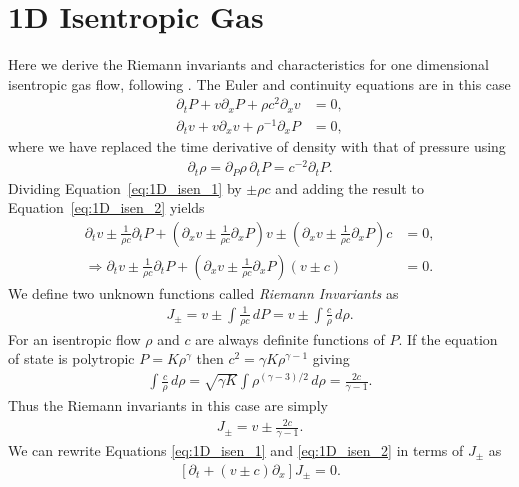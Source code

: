 \chapter{1D Isentropic Gas} \label{appendix:isentropic_riemann}

Here we derive the Riemann invariants and characteristics for one dimensional isentropic gas flow, following \citet{landau1987}.
The Euler and continuity equations are in this case
\begin{align}
    \partial_t P + v \partial_x P + \rho c^2 \partial_x v &= 0, \label{eq:1D_isen_1} \\
    \partial_t v + v \partial_x v + \rho^{-1} \partial_x P &=0, \label{eq:1D_isen_2}
\end{align}
where we have replaced the time derivative of density with that of pressure using
\begin{align}
    \partial_t \rho = \partial_P \rho \, \partial_t P = c^{-2} \partial_t P.
\end{align}
Dividing Equation~\eqref{eq:1D_isen_1} by $\pm \rho c$ and adding the result to Equation~\eqref{eq:1D_isen_2} yields
\begin{align}
    \partial_t v \pm \frac{1}{\rho c} \partial_t P + \left( \partial_x v \pm \frac{1}{\rho c} \partial_x P \right) v \pm \left( \partial_x v \pm \frac{1}{\rho c} \partial_x P \right) c &= 0, \\
    \Rightarrow  \partial_t v \pm \frac{1}{\rho c} \partial_t P + \left( \partial_x v \pm \frac{1}{\rho c} \partial_x P \right) \left( v \pm c \right) &= 0.
\end{align}
We define two unknown functions called \textit{Riemann Invariants} as
\begin{align}
    J_\pm = v \pm \int \frac{1}{\rho c} \, dP = v \pm \int \frac{c}{\rho} \, d\rho.
\end{align}
For an isentropic flow $\rho$ and $c$ are always definite functions of $P$.
If the equation of state is polytropic $P = K \rho^\gamma$ then $c^2 = \gamma K \rho^{\gamma-1}$ giving
\begin{align}
    \int \frac{c}{\rho} \, d\rho = \sqrt{\gamma K} \int \rho^{(\gamma-3)/2} \, d\rho = \frac{2 c}{\gamma -1}.
\end{align}
Thus the Riemann invariants in this case are simply
\begin{align}
    J_\pm = v \pm \frac{2 c}{\gamma -1}.
\end{align}
We can rewrite Equations \eqref{eq:1D_isen_1} and \eqref{eq:1D_isen_2} in terms of $J_\pm$ as
\begin{align}
    \left[ \partial_t + \left( v \pm c \right) \partial_x \right] J_\pm = 0. \label{eq:1d_isen_riemann_eq}
\end{align}

